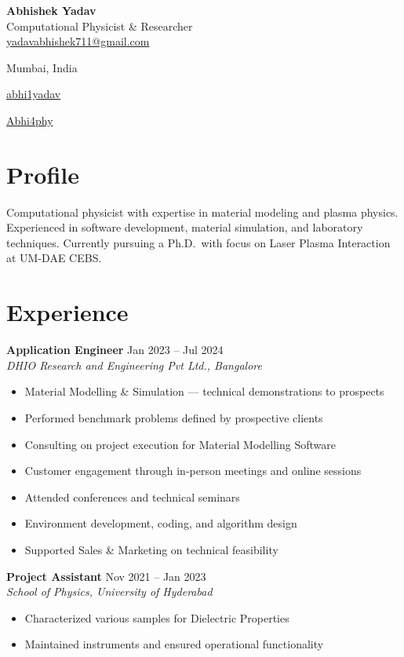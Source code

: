 \documentclass[a4paper,11pt]{article}
\newcommand{\cventry}[4]{%
  \noindent\textbf{#1} \hfill \textcolor{accent}{\small #2}\\
  \textit{\color{medgray}#3}\\
  #4\vspace{0.4em}
}
\newcommand{\contactitem}[2]{%
  \textcolor{accent}{#1}\enspace #2%
}
\begin{document}
\begin{center}
  {\LARGE\bfseries\color{darkgray} Abhishek Yadav}\\[4pt]
  {\color{accent}\normalsize Computational Physicist \& Researcher}\\[8pt]
  \contactitem{\faEnvelope}{\href{mailto:yadavabhishek711@gmail.com}{yadavabhishek711@gmail.com}}
  \quad
  \contactitem{\faMapMarker*}{Mumbai, India}
  \quad
  \contactitem{\faLinkedin}{\href{https://www.linkedin.com/in/abhi1yadav/}{abhi1yadav}}
  \quad
  \contactitem{\faGithub}{\href{https://github.com/Abhi4phy}{Abhi4phy}}
\end{center}

\section{Profile}
Computational physicist with expertise in material modeling and plasma physics.
Experienced in software development, material simulation, and laboratory techniques.
Currently pursuing a Ph.D.\ with focus on Laser Plasma Interaction at UM-DAE CEBS.

\section{Experience}

\cventry{Application Engineer}{Jan 2023 -- Jul 2024}
{DHIO Research and Engineering Pvt Ltd., Bangalore}{%
\begin{itemize}[leftmargin=1.2em, nosep, topsep=2pt]
  \item Material Modelling \& Simulation --- technical demonstrations to prospects
  \item Performed benchmark problems defined by prospective clients
  \item Consulting on project execution for Material Modelling Software
  \item Customer engagement through in-person meetings and online sessions
  \item Attended conferences and technical seminars
  \item Environment development, coding, and algorithm design
  \item Supported Sales \& Marketing on technical feasibility
\end{itemize}}

\cventry{Project Assistant}{Nov 2021 -- Jan 2023}
{School of Physics, University of Hyderabad}{%
\begin{itemize}[leftmargin=1.2em, nosep, topsep=2pt]
  \item Characterized various samples for Dielectric Properties
  \item Maintained instruments and ensured operational functionality
\end{itemize}}
\end{document}
